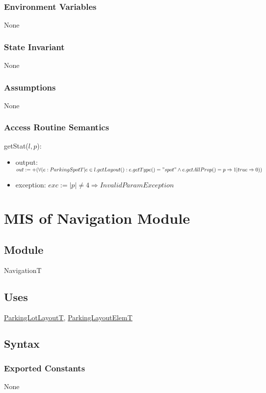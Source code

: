 \documentclass[12pt, titlepage]{article}
\begin{document}
\subsubsection{Environment Variables}
None

\subsubsection{State Invariant}
None

\subsubsection{Assumptions}
None

\subsubsection{Access Routine Semantics}

\noindent getStat($l, p$):
\begin{itemize} 
\item output: $out := +(\forall (e : ParkingSpotT | e \in l.getLayout() :
e.getType() = "spot" \land e.getAllProp() = p \Rightarrow 1 | true \Rightarrow
0))$
\item exception: $exc := |p| \neq 4 \Rightarrow InvalidParamException$
\end{itemize}

\newpage

\section{MIS of Navigation Module} 
\label{navigation:Module}

\subsection{Module}
NavigationT

\subsection{Uses}
\hyperref[parkingLotLayout:Module]{ParkingLotLayoutT}, 
\hyperref[parkingLayoutElem:Module]{ParkingLayoutElemT}

\subsection{Syntax}

\subsubsection{Exported Constants}
None
\end{document}
